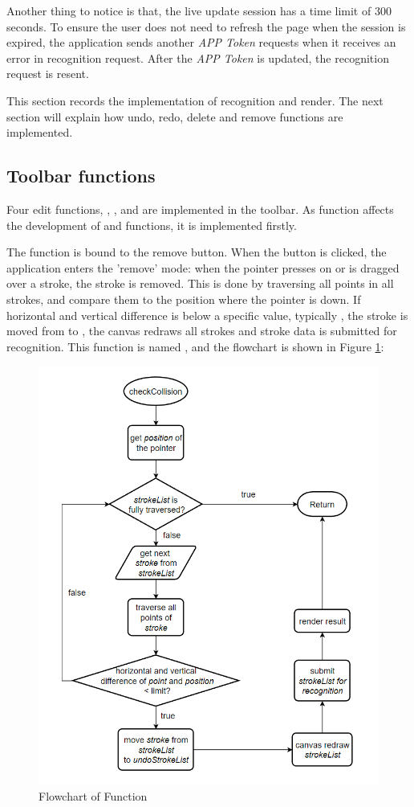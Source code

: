 \documentclass[12pt,twoside]{report}
\begin{document}
Another thing to notice is that, the live update session has a time limit of 300 seconds. To ensure the user does not need to refresh the page when the session is expired, the application sends another \textit{APP Token} requests when it receives an  error in recognition request. After the \textit{APP Token} is updated, the recognition request is resent.

This section records the implementation of recognition and render. The next section will explain how undo, redo, delete and remove functions are implemented.

\subsection{Toolbar functions}
Four edit functions, , ,  and  are implemented in the toolbar. As  function affects the development of  and  functions, it is implemented firstly.

The  function is bound to the remove button. When the button is
clicked, the application enters the 'remove' mode: when the pointer presses on
or is dragged over a stroke, the stroke is removed. This is done by traversing
all points in all strokes, and compare them to the position where the pointer is
down. If horizontal and vertical difference is below a specific value, typically
, the stroke is moved from  to ,  the canvas
redraws all strokes and stroke data is submitted for recognition. This function
is named , and the flowchart is shown in Figure \ref{fig:flowchart-remove}:
\begin{figure}[H]
    \centering
    \includegraphics[width=0.8\linewidth, frame]{figures/flowchart-remove.png}
    \caption{Flowchart of Function }
    \label{fig:flowchart-remove}
\end{figure}
\end{document}
